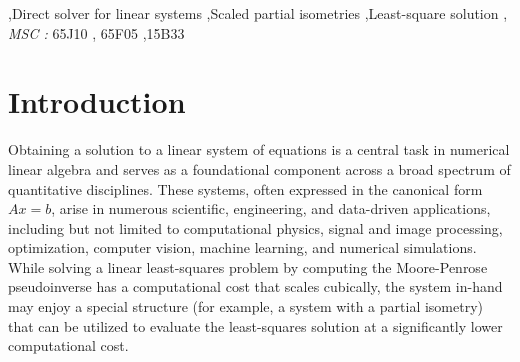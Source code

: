 \documentclass[a4paper,fleqn]{cas-sc}
\theoremstyle{definition}
\theoremstyle{remark}
\begin{document}

\fntext[1]{}


\begin{abstract}
We present an $O(mn)$ direct least-squares solver for $m \times n$ linear systems with a scaled partial isometry. The proposed algorithm is also useful when the system is block diagonal and each block is a scaled partial isometry with distinct scaling factors. We also include numerical experiments as a demonstration.
\end{abstract}




\begin{keywords}
 \sep Direct solver for linear systems \sep Scaled partial isometries  \sep Least-square solution \sep \vspace{0.5em}
\noindent\textit{MSC : } 65J10 , 65F05 ,15B33
\end{keywords}

\maketitle

\section{Introduction}\label{sec:introduction}

Obtaining a solution to a linear system of equations is a central task in numerical linear algebra and serves as a foundational component across a broad spectrum of quantitative disciplines. These systems, often expressed in the canonical form $Ax=b$, arise in numerous scientific, engineering, and data-driven applications, including but not limited to computational physics, signal and image processing, optimization, computer vision, machine learning, and numerical simulations. While solving a linear least-squares problem by computing the Moore-Penrose pseudoinverse \cite{svd} has a computational cost that scales cubically, the system in-hand may enjoy a special structure (for example, a system with a partial isometry) that can be utilized to evaluate the least-squares solution at a significantly lower computational cost.
\end{document}
